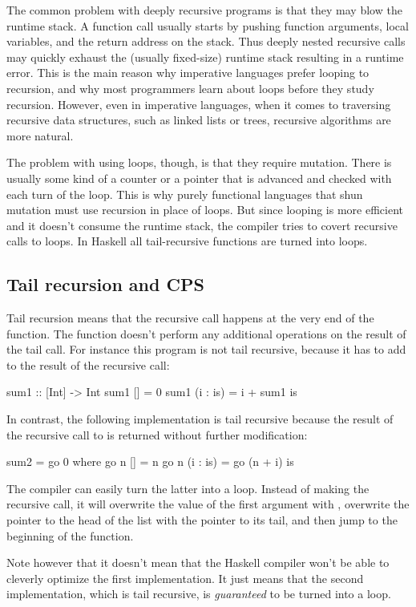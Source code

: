 \documentclass[DaoFP]{subfiles}
\begin{document}
The common problem with deeply recursive programs is that they may blow the runtime stack. A function call usually starts by pushing function arguments, local variables, and the return address on the stack. Thus deeply nested recursive calls may quickly exhaust the (usually fixed-size) runtime stack resulting in a runtime error. This is the main reason why imperative languages prefer looping to recursion, and why most programmers learn about loops before they study recursion. However, even in imperative languages, when it comes to traversing recursive data structures, such as linked lists or trees, recursive algorithms are more natural.

The problem with using loops, though, is that they require mutation. There is usually some kind of a counter or a pointer that is advanced and checked with each turn of the loop. This is why purely functional languages that shun mutation must use recursion in place of loops. But since looping is more efficient and it doesn't consume the runtime stack, the compiler tries to covert recursive calls to loops. In Haskell all tail-recursive functions are turned into loops. 

\subsection{Tail recursion and CPS}

Tail recursion means that the recursive call happens at the very end of the function. The function doesn't perform any additional operations on the result of the tail call. For instance this program is not tail recursive, because it has to add  to the result of the recursive call:
\begin{haskell}
sum1 :: [Int] -> Int
sum1 [] = 0
sum1 (i : is) = i + sum1 is
\end{haskell}
In contrast, the following implementation is tail recursive because the result of the recursive call to  is returned without further modification:
\begin{haskell}
sum2 = go 0 
  where go n [] = n
        go n (i : is) = go (n + i) is
\end{haskell}
The compiler can easily turn the latter into a loop. Instead of making the recursive call, it will overwrite the value of the first argument  with , overwrite the pointer to the head of the list with the pointer to its tail, and then jump to the beginning of the function. 

Note however that it doesn't mean that the Haskell compiler won't be able to cleverly optimize the first implementation. It just means that the second implementation, which is tail recursive, is \emph{guaranteed} to be turned into a loop.
\end{document}
